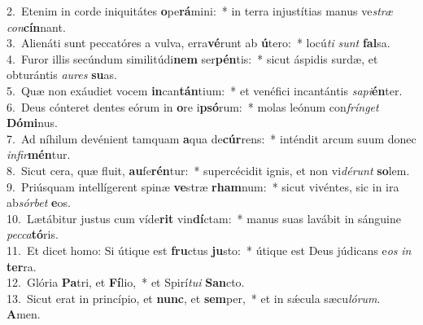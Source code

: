 {2.~}Etenim in corde iniquitátes \textbf{o}pe\textbf{rá}mini:~* in terra injustítias manus ve\textit{stræ} \textit{con}\textbf{cín}nant.\\
{3.~}Alienáti sunt peccatóres a vulva, erra\textbf{vé}runt ab \textbf{ú}tero:~* locú\textit{ti} \textit{sunt} \textbf{fal}sa.\\
{4.~}Furor illis secúndum similitúdi\textbf{nem} ser\textbf{pén}tis:~* sicut áspidis surdæ, et obturántis \textit{au}\textit{res} \textbf{su}as.\\
{5.~}Quæ non exáudiet vocem \textbf{in}can\textbf{tán}tium:~* et venéfici incantántis \textit{sa}\textit{pi}\textbf{én}ter.\\
{6.~}Deus cónteret dentes eórum in \textbf{o}re i\textbf{psó}rum:~* molas leónum con\textit{frín}\textit{get} \textbf{Dó}\textbf{mi}nus.\\
{7.~}Ad níhilum devénient tamquam \textbf{a}qua de\textbf{cúr}rens:~* inténdit arcum suum donec \textit{in}\textit{fir}\textbf{mén}tur.\\
{8.~}Sicut cera, quæ fluit, \textbf{au}fe\textbf{rén}tur:~* supercécidit ignis, et non vi\textit{dé}\textit{runt} \textbf{so}lem.\\
{9.~}Priúsquam intellígerent spinæ \textbf{ve}stræ \textbf{rham}num:~* sicut vivéntes, sic in ira ab\textit{sór}\textit{bet} \textbf{e}os.\\
{10.~}Lætábitur justus cum víde\textbf{rit} vin\textbf{dí}ctam:~* manus suas lavábit in sánguine \textit{pec}\textit{ca}\textbf{tó}ris.\\
{11.~}Et dicet homo: Si útique est \textbf{fru}ctus \textbf{ju}sto:~* útique est Deus júdicans e\textit{os} \textit{in} \textbf{ter}ra.\\
{12.~}Glória \textbf{Pa}tri, et \textbf{Fí}lio,~* et Spirí\textit{tu}\textit{i} \textbf{San}cto.\\
{13.~}Sicut erat in princípio, et \textbf{nunc}, et \textbf{sem}per,~* et in sǽcula sæcu\textit{ló}\textit{rum}. \textbf{A}men.\\
